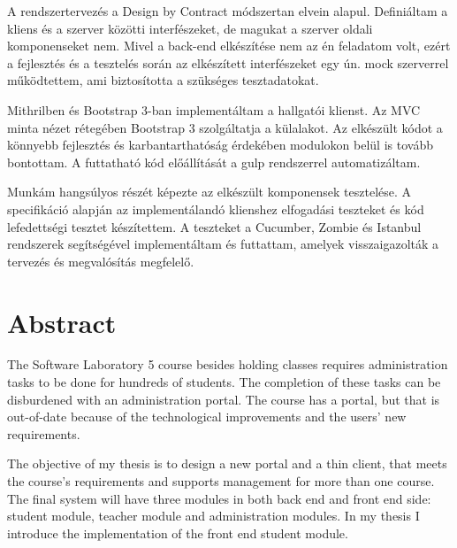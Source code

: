 A rendszertervezés a Design by Contract módszertan elvein alapul. Definiáltam a kliens és a szerver közötti interfészeket, de magukat a szerver oldali komponenseket nem. Mivel a back-end elkészítése nem az én feladatom volt, ezért a fejlesztés és a tesztelés során az elkészített interfészeket egy ún. mock szerverrel működtettem, ami biztosította a szükséges tesztadatokat.

Mithrilben és Bootstrap 3-ban implementáltam a hallgatói klienst. Az MVC minta nézet rétegében Bootstrap 3 szolgáltatja a külalakot. Az elkészült kódot a könnyebb fejlesztés és karbantarthatóság érdekében modulokon belül is tovább bontottam. A futtatható kód előállítását a gulp rendszerrel automatizáltam.

Munkám hangsúlyos részét képezte az elkészült komponensek tesztelése. A specifikáció alapján az implementálandó klienshez elfogadási teszteket és kód lefedettségi tesztet készítettem. A teszteket a Cucumber, Zombie és Istanbul rendszerek segítségével implementáltam és futtattam, amelyek visszaigazolták a tervezés és megvalósítás megfelelő.





\vfill
{}
\englishParagraph


\chapter*{Abstract}


The Software Laboratory 5 course besides holding classes requires administration tasks to be done for hundreds of students. The completion of these tasks can be disburdened with an administration portal. The course has a portal, but that is out-of-date because of the technological improvements and the users' new requirements.

The objective of my thesis is to design a new portal and a thin client, that meets the course's requirements and supports management for more than one course. The final system will have three modules in both back end and front end side: student module, teacher module and administration modules. In my thesis I introduce the implementation of the front end student module.


